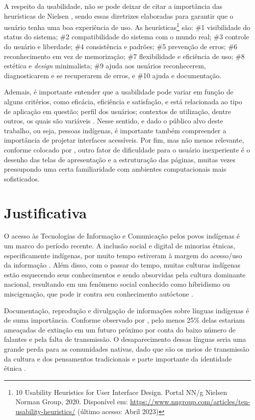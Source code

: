 A respeito da usabilidade, não se pode deixar de citar a importância das heurísticas de Nielsen \cite{nielsen1994}, sendo essas diretrizes elaboradas para garantir que o
usuário tenha uma boa experiência de uso. As heurísticas\footnote{10 Usability Heuristics for User Interface Design. Portal NN/g Nielsen Norman Group, 2020. Disponível
em: \url{https://www.nngroup.com/articles/ten-usability-heuristics/} (último acesso: Abril 2023)} são: \#1 visibilidade do status do sistema; \#2 compatibilidade do
sistema com o mundo real; \#3 controle do usuário e liberdade; \#4 consistência e padrões; \#5 prevenção de erros; \#6 reconhecimento em vez de memorização; \#7
flexibilidade e eficiência de uso; \#8 estética e \textit{design} minimalista; \#9 ajuda aos usuários reconhecerem, diagnosticarem e se recuperarem de erros, e \#10 ajuda e 
documentação.

Ademais, é importante entender que a usabilidade pode variar em função de alguns critérios, como eficácia, eficiência e satisfação, e está relacionada ao tipo de
aplicação em questão; perfil dos usuários; contextos de utilização, dentre outros, os quais são variáveis \cite{winckler2022}. Nesse sentido, e dado o público alvo deste
trabalho, ou seja, pessoas indígenas, é importante também compreender a importância de projetar interfaces acessíveis. Por fim, mas não menos relevante, conforme colocado 
por , outro fator de dificuldade para o usuário inexperiente é o desenho das telas de apresentação e a estruturação das páginas, muitas vezes 
pressupondo uma certa familiaridade com ambientes computacionais mais sofisticados.

\section{Justificativa}
\label{sec:Justificativa}

O acesso às Tecnologias de Informação e Comunicação pelos povos indígenas é um marco do período recente. A inclusão social e digital de minorias étnicas, especificamente
indígenas, por muito tempo estiveram à margem do acesso/uso da informação \cite{pinto2010}. Além disso, com o passar do tempo, muitas culturas indígenas estão esquecendo
seus conhecimentos e sendo absorvidas pela cultura dominante nacional, resultando em um fenômeno social conhecido como hibridismo ou miscigenação, que pode ir contra seu
conhecimento autóctone \cite{pinto2010}.

Documentação, reprodução e divulgação de informações sobre línguas indígenas é de suma importância. Conforme observado por ,
pelo menos 25\% delas estariam ameaçadas de extinção em um futuro próximo por conta do baixo número de falantes e pela falta de transmissão. O desaparecimento dessas línguas
seria uma grande perda para as comunidades nativas, dado que são os meios de transmissão da cultura e dos pensamentos tradicionais e parte importante da identidade étnica
\cite{moore2008}.

